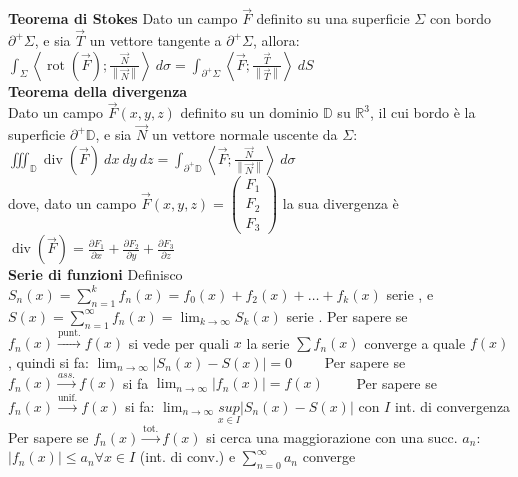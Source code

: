 \documentclass[a4paper, oneside]{article}
\newcommand\dvg{\operatorname{div}}
\newcommand\rot{\operatorname{rot}}
\newcommand{\tab}{\hspace*{2em}}
\begin{document}
    \textbf{Teorema di Stokes}\tab
    Dato un campo $\vec{F}$ definito su una superficie $\Sigma$ con bordo $\partial^+\Sigma$, e sia $\vec{T}$ un vettore tangente a $\partial^+\Sigma$, allora:
    $\int_{\Sigma} \left\langle\rot(\vec{F});\frac{\vec{N}}{\left\lVert\vec{N}\right\rVert }\right\rangle \ d\sigma = \int_{\partial^+\Sigma} \left\langle\vec{F};\frac{\vec{T}}{\left\lVert\vec{T}\right\rVert }\right\rangle \ dS$\\
    \textbf{Teorema della divergenza}\\
    Dato un campo $\vec{F}(x,y,z)$ definito su un dominio $\mathbb{D}$ su $\mathbb{R}^3$, il cui bordo è la superficie $\partial^+\mathbb{D}$, e sia $\vec{N}$ un vettore normale uscente da $\Sigma$:
    $\iiint_{\mathbb{D}} \dvg(\vec{F}) \ dx \ dy \ dz = \int_{\partial^+\mathbb{D}} \left\langle\vec{F};\frac{\vec{N}}{\left\lVert \vec{N}\right\rVert }\right\rangle \ d\sigma$ \\
    dove, dato un campo $\vec{F}(x,y,z)=\begin{pmatrix}
        F_1 \\ F_2 \\ F_3
    \end{pmatrix}$ la sua divergenza è $\dvg(\vec{F}) = \frac{\partial F_1}{\partial x} + \frac{\partial F_2}{\partial y} + \frac{\partial F_3}{\partial z}$\\
    \textbf{Serie di funzioni}\tab 
    Definisco $S_n(x) = \sum_{n=1}^{k} f_n(x) = f_0(x) + f_2(x) + \dots + f_k(x)$ serie , e $S(x) = \sum_{n=1}^{\infty} f_n(x) = \lim_{k \to \infty} S_k(x)$ serie .\tab
    Per sapere se $f_n(x) \overset{\text{punt.}}{\to} f(x)$ si vede per quali $x$ la serie $\sum f_n(x)$ converge a quale $f(x)$, quindi si fa: $\lim_{n \to \infty} \left\lvert S_n(x) - S(x) \right\rvert = 0 \qquad$ Per sapere se $f_n(x) \overset{ass.}{\to} f(x)$ si fa $\lim_{n\to \infty} |f_n(x)| = f(x)\qquad$  Per sapere se $f_n(x) \overset{\text{unif.}}{\to} f(x)$ si fa: $\lim_{n\to \infty} \underset{x\in I}{sup}|S_n(x)-S(x)|$ con $I$ int. di convergenza \tab
    Per sapere se $f_n(x) \overset{\text{tot.}}{\to} f(x)$ si cerca una maggiorazione con una succ. $a_n$: $|f_n(x)| \leq a_n \forall x \in I$ (int. di conv.) e $\sum_{n=0}^{\infty}a_n$ converge\\
\end{document}
